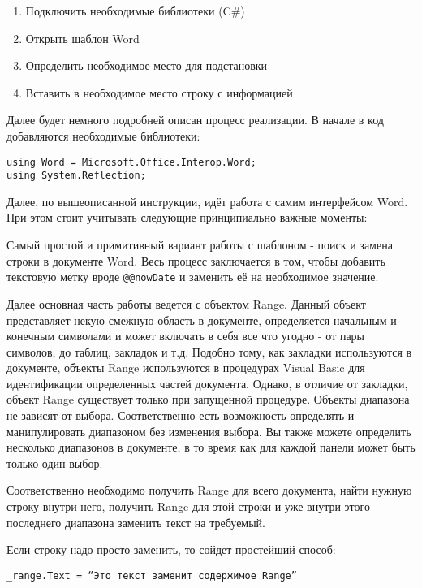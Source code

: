 \begin{enumerate}
\item Подключить необходимые библиотеки (C#)
\item Открыть шаблон Word
\item Определить необходимое место для подстановки
\item Вставить в необходимое место строку с информацией

\end{enumerate}

Далее будет немного подробней описан процесс реализации. В начале в код добавляются необходимые библиотеки:

\begin{verbatim}
using Word = Microsoft.Office.Interop.Word;
using System.Reflection;
\end{verbatim}

Далее, по вышеописанной инструкции, идёт работа с самим интерфейсом Word. При этом стоит учитывать следующие принципиально важные моменты:

Самый простой и примитивный вариант работы с шаблоном - поиск и замена строки в документе Word. Весь процесс заключается в том, чтобы добавить текстовую метку вроде \verb|@@nowDate| и заменить её на необходимое значение.

Далее основная часть работы ведется с объектом Range. Данный объект представляет некую смежную область в документе, определяется начальным и конечным символами и может включать в себя все что угодно - от пары символов, до таблиц, закладок и т.д. Подобно тому, как закладки используются в документе, объекты Range используются в процедурах Visual Basic для идентификации определенных частей документа. Однако, в отличие от закладки, объект Range существует только при запущенной процедуре. Объекты диапазона не зависят от выбора. Соответственно есть возможность определять и манипулировать диапазоном без изменения выбора. Вы также можете определить несколько диапазонов в документе, в то время как для каждой панели может быть только один выбор. 

Соответственно необходимо получить Range для всего документа, найти нужную строку внутри него, получить Range для этой строки и уже внутри этого последнего диапазона заменить текст на требуемый.

Если строку надо просто заменить, то сойдет простейший способ:

\begin{verbatim}
_range.Text = “Это текст заменит содержимое Range”
\end{verbatim}

